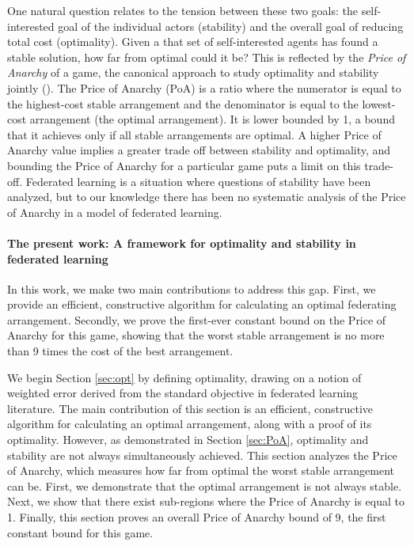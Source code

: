 \documentclass{article}
\begin{document}
One natural question relates to the tension between these two goals: the self-interested goal of the individual actors (stability) and the overall goal of reducing total cost (optimality). Given a that set of self-interested agents has found a stable solution, how far from optimal could it be? This is reflected by the \emph{Price of Anarchy} of a game, the canonical approach to study optimality and stability jointly (\cite{papadimitriou2001algorithms, koutsoupias1999worst}). The Price of Anarchy (PoA) is a ratio where the numerator is equal to the highest-cost stable arrangement and the denominator is equal to the lowest-cost arrangement (the optimal arrangement). It is lower bounded by 1, a bound that it achieves only if all stable arrangements are optimal. A higher Price of Anarchy value implies a greater trade off between stability and optimality, and bounding the Price of Anarchy for a particular game puts a limit on this trade-off. Federated learning is a situation where questions of stability have been analyzed, but to our knowledge there has been no systematic analysis of the Price of Anarchy in a model of federated learning.

\paragraph{\bf The present work: A framework for optimality and stability in federated learning} 

In this work, we make two main contributions to address this gap. First, we provide an efficient, constructive algorithm for calculating an optimal federating arrangement. Secondly, we prove the first-ever constant bound on the Price of Anarchy for this game, showing that the worst stable arrangement is no more than 9 times the cost of the best arrangement.

We begin Section \ref{sec:opt} by defining optimality, drawing on a notion of weighted error derived from the standard objective in federated learning literature. The main contribution of this section is an efficient, constructive algorithm for calculating an optimal arrangement, along with a proof of its optimality. However, as demonstrated in Section \ref{sec:PoA}, optimality and stability are not always simultaneously achieved. This section analyzes the Price of Anarchy, which measures how far from optimal the worst stable arrangement can be. First, we demonstrate that the optimal arrangement is not always stable. Next, we show that there exist sub-regions where the Price of Anarchy is equal to 1. Finally, this section proves an overall Price of Anarchy bound of 9, the first constant bound for this game.
\end{document}
